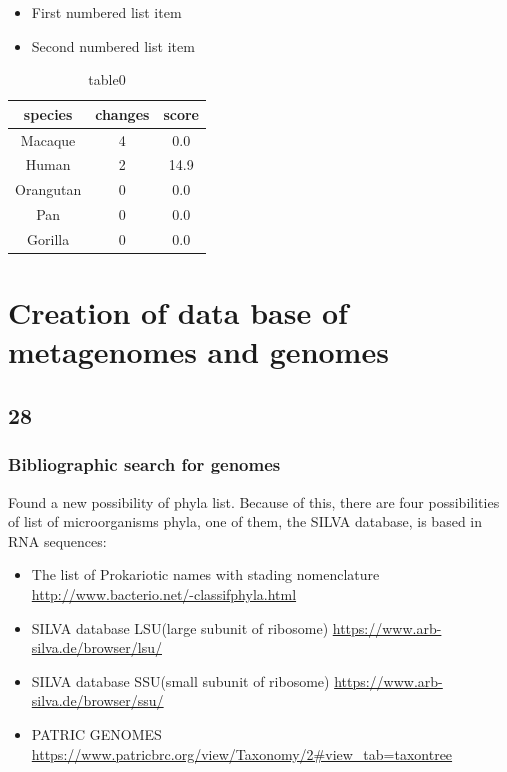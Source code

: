 \documentclass[12pt, a4paper]{report}
\begin{document}
 \begin{itemize}
\item First numbered list item
\item Second numbered list item
\end{itemize}

\begin{table}[!htb]
  \caption{table0}
  \centering
  \begin{tabular}{ccc}
  \hline 
       species&changes&score \\
  \hline
       Macaque&4&0.0 \\
       Human&2&14.9 \\
       Orangutan&0&0.0 \\
       Pan&0&0.0 \\
       Gorilla&0&0.0 \\
  \hline
  \end{tabular}
  \label{table1}
 \end{table}

\chapter{Creation of data base of metagenomes and genomes}
\section{28}
\subsection{Bibliographic search for genomes}
Found a new possibility of phyla list. Because of this, there are four possibilities of list of microorganisms phyla, one of them, the SILVA database, is based in RNA sequences:
\begin{itemize}
\item The list of Prokariotic names with stading nomenclature \url{http://www.bacterio.net/-classifphyla.html}
\item SILVA database LSU(large subunit of ribosome) \url{https://www.arb-silva.de/browser/lsu/}
\item SILVA database SSU(small subunit of ribosome) \url{https://www.arb-silva.de/browser/ssu/}
\item PATRIC GENOMES \url{https://www.patricbrc.org/view/Taxonomy/2#view_tab=taxontree}
 \end{itemize}
\end{document}
